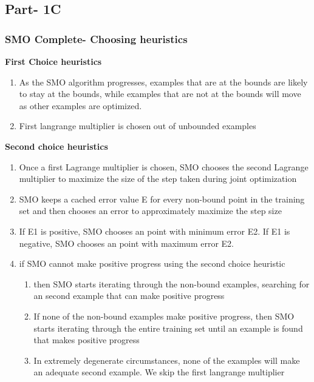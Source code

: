 \documentclass[12pt,t]{beamer}
\begin{document}
\subsection{Part- 1C}
\begin{frame}
    \frametitle{SMO Complete- Choosing heuristics}
    \scriptsize
    \centering \textbf{First Choice heuristics}
    
    \begin{enumerate}
        \item As the SMO algorithm progresses, examples that are at the bounds are
         likely to stay at the bounds, while examples that are not at the bounds will
          move as other examples are optimized.
        \item  First langrange multiplier is chosen out of unbounded examples
    \end{enumerate}

    \centering \textbf{Second choice heuristics}

   
    \begin{enumerate}
        \item Once a first Lagrange multiplier is chosen, SMO chooses the second Lagrange multiplier
                 to maximize the size of the step taken during joint optimization
        \item SMO keeps a cached error value E for every non-bound point in the training 
        set and then chooses an error to approximately maximize the step size
        \item  If E1 is positive, SMO chooses an point with minimum error E2. 
            If E1 is negative, SMO chooses an point with maximum error E2.
        \item if SMO cannot make positive progress using the second choice heuristic
        \begin{enumerate}
            \scriptsize
            \item  then SMO starts iterating through the non-bound examples, searching for an second example that can make positive progress
            \item If none of the non-bound examples make positive progress, then SMO starts iterating through the entire training set until
             an example is found that makes positive progress
             \item In extremely degenerate circumstances, none of the examples will make an adequate second example. We skip the first langrange multiplier
        \end{enumerate}
    \end{enumerate}
    

\end{frame}
\end{document}
